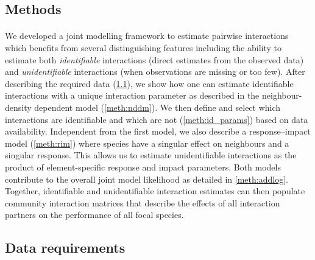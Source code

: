 \documentclass[a4,12pt]{article}
\begin{document}
\begin{refsection}
\section{Methods}

\paragraph{} 
We developed a joint modelling framework to estimate pairwise interactions which benefits from several distinguishing features including the ability to estimate both \textit{identifiable} interactions (direct estimates from the observed data) and \textit{unidentifiable} interactions (when observations are missing or too few). After describing the required data (\ref{meth:data}), we show how one can estimate identifiable interactions with a unique interaction parameter as described in the neighbour-density dependent model (\ref{meth:nddm}). We then define and select which interactions are identifiable and which are not (\ref{meth:id_params}) based on data availability. Independent from the first model, we also describe a response--impact model (\ref{meth:rim}) where species have a singular effect on neighbours and a singular response. This allows us to estimate unidentifiable interactions as the product of element-specific response and impact parameters. Both models contribute to the overall joint model likelihood as detailed in \ref{meth:addlog}. Together, identifiable and unidentifiable interaction estimates can then populate community interaction matrices that describe the effects of all interaction partners on the performance of all focal species. 




    \subsection{Data requirements}
    \label{meth:data}


\end{refsection}
\end{document}
